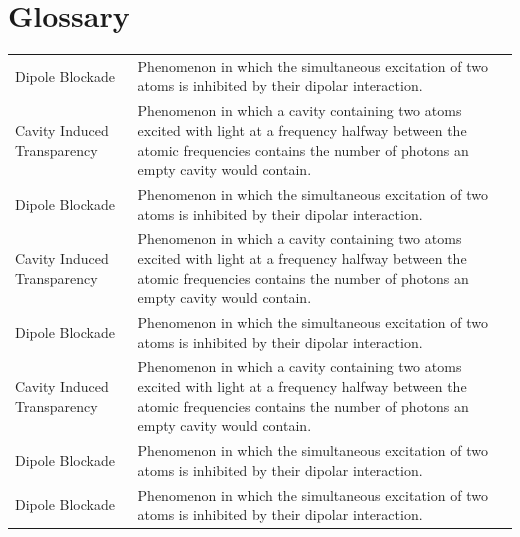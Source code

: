 \chapter*{Glossary}

\setlength\LTleft{-5pt} %

\setlength\LTleft{0pt}
\setlength\LTright{0pt}
\begin{xltabular}{\textwidth}{@{}l X@{}}
    Dipole Blockade             & Phenomenon in which the simultaneous excitation of two atoms is inhibited by their dipolar interaction.                                                                                  \\
    Cavity Induced Transparency & Phenomenon in which a cavity containing two atoms excited with light at a frequency halfway between the atomic frequencies contains the number of photons an empty cavity would contain. \\
    Dipole Blockade             & Phenomenon in which the simultaneous excitation of two atoms is inhibited by their dipolar interaction.                                                                                  \\
    Cavity Induced Transparency & Phenomenon in which a cavity containing two atoms excited with light at a frequency halfway between the atomic frequencies contains the number of photons an empty cavity would contain. \\
    Dipole Blockade             & Phenomenon in which the simultaneous excitation of two atoms is inhibited by their dipolar interaction.                                                                                  \\
    Cavity Induced Transparency & Phenomenon in which a cavity containing two atoms excited with light at a frequency halfway between the atomic frequencies contains the number of photons an empty cavity would contain. \\
    Dipole Blockade             & Phenomenon in which the simultaneous excitation of two atoms is inhibited by their dipolar interaction.                                                                                  \\
    Dipole Blockade             & Phenomenon in which the simultaneous excitation of two atoms is inhibited by their dipolar interaction.                                                                                  \\

\end{xltabular}
